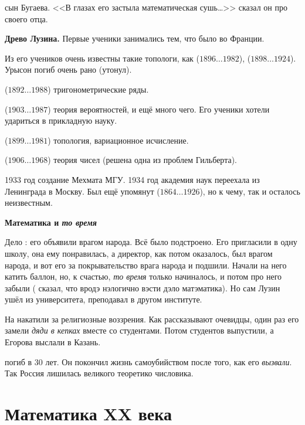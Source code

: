 \documentclass[a4paper,oneside,fleqn,10pt]{article}
\newcommand{\pe}[2]{${#1}\ldots{#2}$}
\begin{document}
 сын Бугаева.  <<В глазах его
застыла математическая сушь\ldots>> сказал он про своего отца.

\textbf{Древо Лузина.}  Первые ученики 
занимались тем, что было во Франции.

Из его учеников очень известны такие топологи, как
 (\pe{1896}{1982}), 
(\pe{1898}{1924}).  Урысон погиб очень рано (утонул).

 (\pe{1892}{1988}) тригонометрические ряды.

 (\pe{1903}{1987}) теория вероятностей, и ещё
много чего.  Его ученики хотели удариться в прикладную науку.

 (\pe{1899}{1981}) топология, вариационное
исчисление.

 (\pe{1906}{1968}) теория чисел (решена одна из
проблем Гильберта).

1933 год создание Мехмата МГУ. 1934 год академия наук переехала из
Ленинграда в Москву.  Был ещё упомянут 
(\pe{1864}{1926}), но к чему, так и осталось неизвестным.

\textbf{Математика и \emph{то время}}

Дело : его объявили врагом народа. Всё было
подстроено.  Его пригласили в одну школу, она ему понравилась, а
директор, как потом оказалось, был врагом народа, и вот его за
покрывательство врага народа и подшили.  Начали на него катить баллон,
но, к счастью, \emph{то время} только начиналось, и потом про него
забыли ( сказал, что вродэ нэлогично вэсти дэло
матэматика). Но сам Лузин ушёл из университета, преподавал в другом
институте.

На  накатили за религиозные воззрения. Как
рассказывают очевидцы, один раз его замели \emph{дяди в кепках} вместе
со студентами. Потом студентов выпустили, а Егорова выслали в Казань.

 погиб в 30 лет. Он покончил жизнь самоубийством
после того, как его \emph{вызвали}.  Так Россия лишилась великого
теоретико числовика.



\section{Математика XX века}
\end{document}
